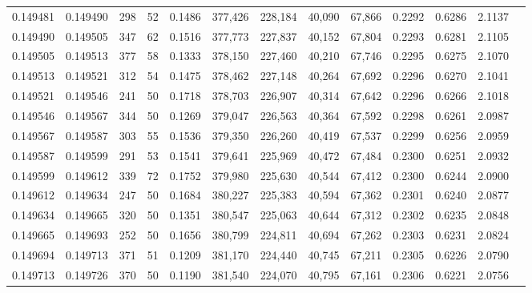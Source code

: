 \begin{tabular}{rrrrrrrrrrrrr}
0.149481 & 0.149490 &   298 &  52 &                                     0.1486 & 377,426 & 228,184 &  40,090 &  67,866 & 0.2292 & 0.6286 & 2.1137 \\
0.149490 & 0.149505 &   347 &  62 &                                     0.1516 & 377,773 & 227,837 &  40,152 &  67,804 & 0.2293 & 0.6281 & 2.1105 \\
0.149505 & 0.149513 &   377 &  58 &                                     0.1333 & 378,150 & 227,460 &  40,210 &  67,746 & 0.2295 & 0.6275 & 2.1070 \\
0.149513 & 0.149521 &   312 &  54 &                                     0.1475 & 378,462 & 227,148 &  40,264 &  67,692 & 0.2296 & 0.6270 & 2.1041 \\
0.149521 & 0.149546 &   241 &  50 &                                     0.1718 & 378,703 & 226,907 &  40,314 &  67,642 & 0.2296 & 0.6266 & 2.1018 \\
0.149546 & 0.149567 &   344 &  50 &                                     0.1269 & 379,047 & 226,563 &  40,364 &  67,592 & 0.2298 & 0.6261 & 2.0987 \\
0.149567 & 0.149587 &   303 &  55 &                                     0.1536 & 379,350 & 226,260 &  40,419 &  67,537 & 0.2299 & 0.6256 & 2.0959 \\
0.149587 & 0.149599 &   291 &  53 &                                     0.1541 & 379,641 & 225,969 &  40,472 &  67,484 & 0.2300 & 0.6251 & 2.0932 \\
0.149599 & 0.149612 &   339 &  72 &                                     0.1752 & 379,980 & 225,630 &  40,544 &  67,412 & 0.2300 & 0.6244 & 2.0900 \\
0.149612 & 0.149634 &   247 &  50 &                                     0.1684 & 380,227 & 225,383 &  40,594 &  67,362 & 0.2301 & 0.6240 & 2.0877 \\
0.149634 & 0.149665 &   320 &  50 &                                     0.1351 & 380,547 & 225,063 &  40,644 &  67,312 & 0.2302 & 0.6235 & 2.0848 \\
0.149665 & 0.149693 &   252 &  50 &                                     0.1656 & 380,799 & 224,811 &  40,694 &  67,262 & 0.2303 & 0.6231 & 2.0824 \\
0.149694 & 0.149713 &   371 &  51 &                                     0.1209 & 381,170 & 224,440 &  40,745 &  67,211 & 0.2305 & 0.6226 & 2.0790 \\
0.149713 & 0.149726 &   370 &  50 &                                     0.1190 & 381,540 & 224,070 &  40,795 &  67,161 & 0.2306 & 0.6221 & 2.0756 \\

\end{tabular}
